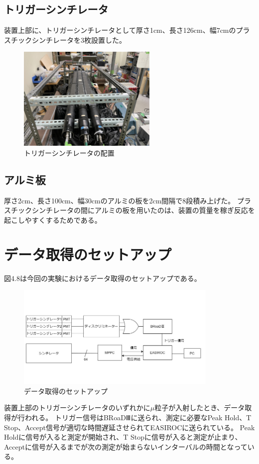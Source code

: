 \subsection{トリガーシンチレータ}
装置上部に、トリガーシンチレータとして厚さ1cm、長さ126cm、幅7cmのプラスチックシンチレータを3枚設置した。
\begin{figure}[H]
    \centering
    \includegraphics[height=5cm]{img/Trigger.jpeg}
    \caption{トリガーシンチレータの配置}
\end{figure}

\subsection{アルミ板}
厚さ2cm、長さ100cm、幅30cmのアルミの板を2cm間隔で8段積み上げた。
プラスチックシンチレータの間にアルミの板を用いたのは、装置の質量を稼ぎ反応を起こしやすくするためである。

\section{データ取得のセットアップ}
図4.8は今回の実験におけるデータ取得のセットアップである。
\begin{figure}[H]
    \centering
    \includegraphics[height=5cm]{img/setup.jpg}
    \caption{データ取得のセットアップ}
\end{figure}
装置上部のトリガーシンチレータのいずれかに$\mu$粒子が入射したとき、データ取得が行われる。
トリガー信号はBRoaDⅢに送られ、測定に必要なPeak Hold、T Stop、Accept信号が適切な時間遅延させられてEASIROCに送られている。
Peak Holdに信号が入ると測定が開始され、T Stopに信号が入ると測定が止まり、Acceptに信号が入るまでが次の測定が始まらないインターバルの時間となっている。

